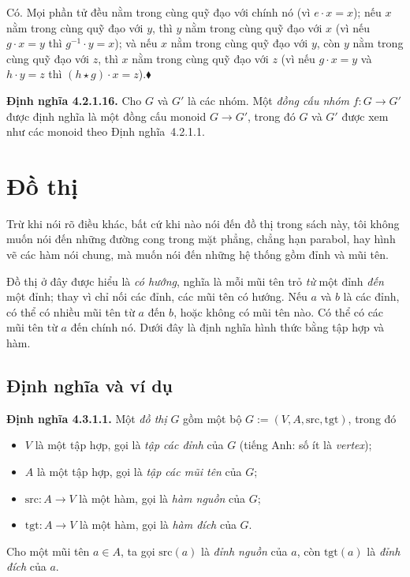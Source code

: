 Có. Mọi phần tử đều nằm trong cùng quỹ đạo với chính nó (vì $e\cdot x=x$); nếu $x$ nằm trong cùng quỹ đạo với $y$, thì $y$ nằm trong cùng quỹ đạo với $x$ (vì nếu $g\cdot x=y$ thì $g^{-1}\cdot y=x$); và nếu $x$ nằm trong cùng quỹ đạo với $y$, còn $y$ nằm trong cùng quỹ đạo với $z$, thì $x$ nằm trong cùng quỹ đạo với $z$ (vì nếu $g\cdot x=y$ và $h\cdot y=z$ thì $(h\star g)\cdot x=z$).\hfill$\blacklozenge$

\noindent\textbf{Định nghĩa 4.2.1.16.} Cho $G$ và $G'$ là các nhóm. Một \emph{đồng cấu nhóm} $f:G\to G'$ được định nghĩa là một đồng cấu monoid $G\to G'$, trong đó $G$ và $G'$ được xem như các monoid theo Định nghĩa~4.2.1.1.

\section{Đồ thị}

Trừ khi nói rõ điều khác, bất cứ khi nào nói đến đồ thị trong sách này, tôi không muốn nói đến những đường cong trong mặt phẳng, chẳng hạn parabol, hay hình vẽ các hàm nói chung, mà muốn nói đến những hệ thống gồm đỉnh và mũi tên.

Đồ thị ở đây được hiểu là \emph{có hướng}, nghĩa là mỗi mũi tên trỏ \emph{từ} một đỉnh \emph{đến} một đỉnh; thay vì chỉ nối các đỉnh, các mũi tên có hướng. Nếu $a$ và $b$ là các đỉnh, có thể có nhiều mũi tên từ $a$ đến $b$, hoặc không có mũi tên nào. Có thể có các mũi tên từ $a$ đến chính nó. Dưới đây là định nghĩa hình thức bằng tập hợp và hàm.

\subsection{Định nghĩa và ví dụ}

\noindent\textbf{Định nghĩa 4.3.1.1.} Một \emph{đồ thị} $G$ gồm một bộ $G:=(V,A,\mathrm{src},\mathrm{tgt})$, trong đó
\begin{itemize}
\item $V$ là một tập hợp, gọi là \emph{tập các đỉnh} của $G$ (tiếng Anh: số ít là \emph{vertex});
\item $A$ là một tập hợp, gọi là \emph{tập các mũi tên} của $G$;
\item $\mathrm{src}:A\to V$ là một hàm, gọi là \emph{hàm nguồn} của $G$;
\item $\mathrm{tgt}:A\to V$ là một hàm, gọi là \emph{hàm đích} của $G$.
\end{itemize}
Cho một mũi tên $a\in A$, ta gọi $\mathrm{src}(a)$ là \emph{đỉnh nguồn} của $a$, còn $\mathrm{tgt}(a)$ là \emph{đỉnh đích} của $a$.

